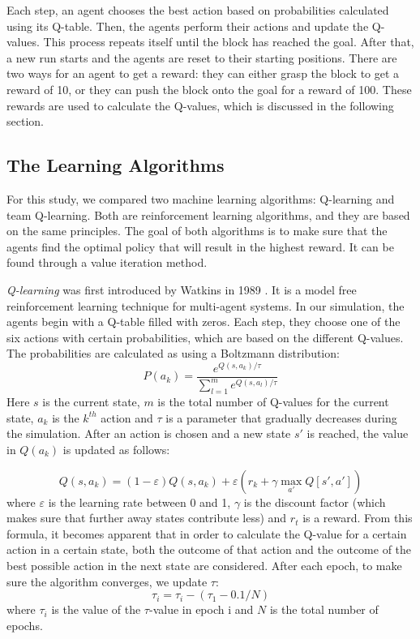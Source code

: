 Each step, an agent chooses the best action based on probabilities calculated using its Q-table. Then, the agents perform their actions and update the Q-values. This process repeats itself until the block has reached the goal. After that, a new run starts and the agents are reset to their starting positions. There are two ways for an agent to get a reward: they can either grasp the block to get a reward of 10, or they can push the block onto the goal for a reward of 100. These rewards are used to calculate the Q-values, which is discussed in the following section.

\subsection{The Learning Algorithms}
For this study, we compared two machine learning algorithms: Q-learning and team Q-learning. Both are reinforcement learning algorithms, and they are based on the same principles. The goal of both algorithms is to make sure that the agents find the optimal policy that will result in the highest reward. It can be found through a value iteration method.

\textit{Q-learning} was first introduced by Watkins in 1989 \cite{watkins1989}. It is a model free reinforcement learning technique for multi-agent systems. In our simulation, the agents begin with a Q-table filled with zeros. Each step, they choose one of the six actions with certain probabilities, which are based on the different Q-values. The probabilities are calculated as using a Boltzmann distribution: 
\begin{equation}
	P(a_{k})=\frac{e^{Q(s,a_{k})/ \tau}}{\sum_{l=1}^{m}e^{Q(s,a_{l})/ \tau}}
\end{equation}
Here $s$ is the current state, $m$ is the total number of Q-values for the current state, $a_{k}$ is the $k^{th}$ action and $\tau$ is a parameter that gradually decreases during the simulation. After an action is chosen and a new state $s'$ is reached, the value in $Q(a_{k})$ is updated as follows: 

\begin{equation}
	Q(s,a_{k}) = (1- \varepsilon) Q(s,a_{k})+ \varepsilon (r_k + \gamma \max_{a'} Q[s', a'])
\end{equation}
where $\varepsilon$ is the learning rate between 0 and 1, $\gamma$ is the discount factor (which makes sure that further away states contribute less) and $r_t$ is a reward. From this formula, it becomes apparent that in order to calculate the Q-value for a certain action in a certain state, both the outcome of that action and the outcome of the best possible action in the next state are considered. After each epoch, to make sure the algorithm converges, we update $\tau$: 
\begin{equation}
	\tau_{i} = \tau_{i}-(\tau_{1}-0.1/N)
\end{equation}
where $\tau_{i}$ is the value of the $\tau$-value in epoch i and $N$ is the total number of epochs.

